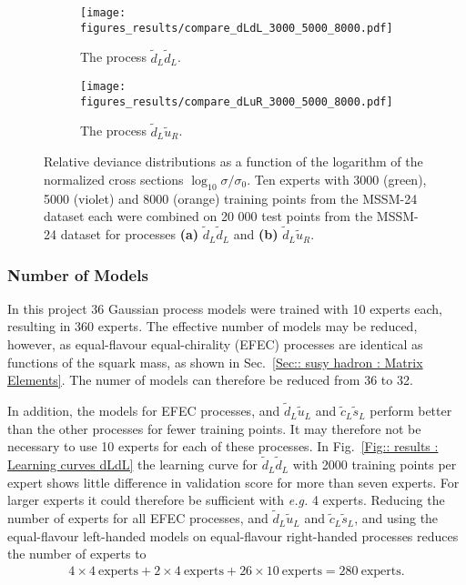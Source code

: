 \documentclass[twoside,english]{uiofysmaster}
\begin{document}
\begin{figure}
    \centering
    \begin{subfigure}[b]{0.9\textwidth}
        \texttt{[image: figures\_results/compare\_dLdL\_3000\_5000\_8000.pdf]}
        \caption{The process $\widetilde{d}_L \widetilde{d}_L$.}
        \label{Fig:: results : RD MSSM-24 uLuL}
    \end{subfigure}
    \begin{subfigure}[b]{0.9\textwidth}
        \texttt{[image: figures\_results/compare\_dLuR\_3000\_5000\_8000.pdf]}
        \caption{The process $\widetilde{d}_L\widetilde{u}_R$.}
        \label{Fig :: results : RD MSSM-24 uLdL}
    \end{subfigure}
    \caption{Relative deviance distributions as a function of the logarithm of the normalized cross sections $\log_{10} \sigma / \sigma_0$. Ten experts with 3000 (green), 5000 (violet) and 8000 (orange) training points from the MSSM-24 dataset each were combined on 20 000 test points from the MSSM-24 dataset for processes \textbf{(a)}  $\widetilde{d}_L \widetilde{d}_L$ and \textbf{(b)} $\widetilde{d}_L\widetilde{u}_R$. }
\label{Fig:: results : RD 3000 vs 5000}
\end{figure}

\subsubsection{Number of Models}

In this project 36 Gaussian process models were trained with 10 experts each, resulting in 360 experts. The effective number of models may be reduced, however, as equal-flavour equal-chirality (EFEC) processes are identical as functions of the squark mass, as shown in Sec.~\ref{Sec:: susy hadron : Matrix Elements}. The numer of models can therefore be reduced from 36 to 32.

In addition, the models for EFEC processes, and $\widetilde{d}_L \widetilde{u}_L$ and $\widetilde{c}_L \widetilde{s}_L$ perform better than the other processes for fewer training points. It may therefore not be necessary to use 10 experts for each of these processes. In Fig.~\ref{Fig:: results : Learning curves dLdL} the learning curve for $\widetilde{d}_L \widetilde{d}_L$ with 2000 training points per expert shows little difference in validation score for more than seven experts. For larger experts it could therefore be sufficient with \textit{e.g.} 4 experts. Reducing the number of experts for all EFEC processes, and $\widetilde{d}_L \widetilde{u}_L$ and $\widetilde{c}_L \widetilde{s}_L$, and using the equal-flavour left-handed models on equal-flavour right-handed processes reduces the number of experts to
\begin{align}
4 \times 4~\mathrm{experts} + 2 \times 4~\mathrm{experts} +  26 \times 10~\mathrm{experts} = 280~\mathrm{experts}. \nonumber
\end{align}
\end{document}
